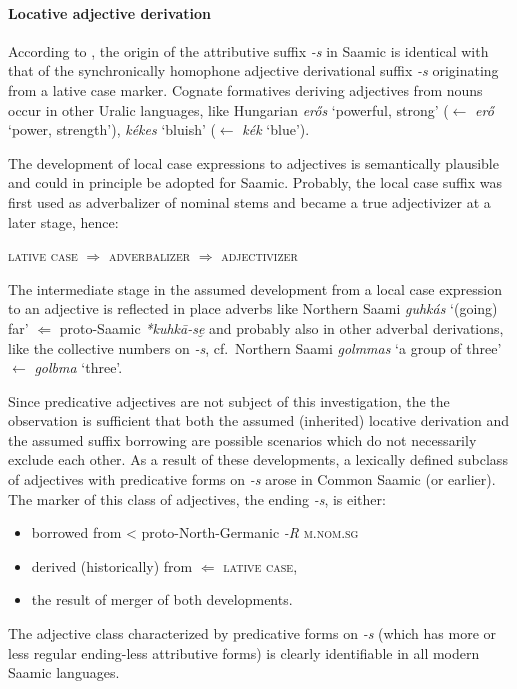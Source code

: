 {\paragraph{Locative adjective derivation} According to \citet[96]{bergsland1946}, the origin of the attributive suffix \textit{-s} in Saamic is identical with that of the synchronically homophone adjective derivational suffix \textit{-s} originating from a lative case marker. Cognate formatives deriving adjectives from nouns occur in other Uralic languages, like Hungarian \textit{erős} ‘powerful, strong’ ($\leftarrow$ \textit{erő} ‘power, strength’), \textit{kékes} ‘bluish’ ($\leftarrow$ \textit{kék} ‘blue’).

The development of local case expressions to adjectives is semantically plausible and could in principle be adopted for Saamic. Probably, the local case suffix was first used as adverbalizer of nominal stems and became a true adjectivizer at a later stage, hence:

\begin{exe}
\ex	\textsc{lative case} $\Rightarrow$ \textsc{adverbalizer} $\Rightarrow$ \textsc{adjectivizer}
\end{exe}
The intermediate stage in the assumed development from a local case expression to an adjective is reflected in place adverbs like Northern Saami \textit{guhkás} ‘(going) far’ $\Leftarrow$ proto-Saamic \textit{*kuhkā-se̮} \cite[246]{sammallahti1998b} and probably also in other adverbal derivations, like the collective numbers on \textit{-s}, cf.~Northern Saami \textit{golmmas} ‘a group of three’ $\leftarrow$ \textit{golbma} ‘three’.

Since predicative adjectives are not subject of this investigation, the the observation is sufficient that both the assumed (inherited) locative derivation and the assumed suffix borrowing are possible scenarios which do not necessarily exclude each other. As a result of these developments, a lexically defined subclass of adjectives with predicative forms on \textit{-s} arose in Common Saamic (or earlier). The marker of this class of adjectives, the ending \textit{-s}, is either:
\begin{itemize}
\item borrowed from < proto-North-Germanic \textit{-R} \textsc{m.nom.sg}
\item derived (historically) from $\Leftarrow$ \textsc{lative case}, %
\item the result of merger of both developments.
\end{itemize}
\noindent The adjective class characterized by predicative forms on \textit{-s} (which has more or less regular ending-less attributive forms) is clearly identifiable in all modern Saamic languages.

}
